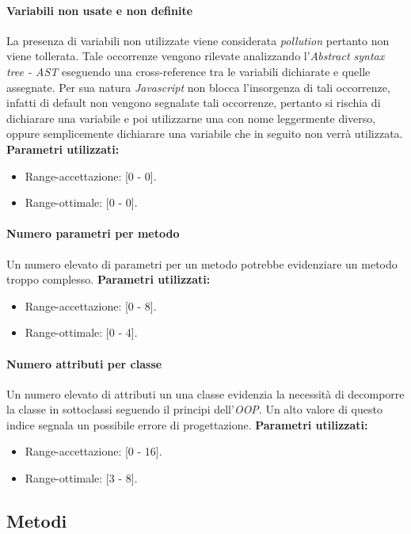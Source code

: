 			\paragraph{Variabili non usate e non definite}
			La presenza di variabili non utilizzate viene considerata \emph{pollution} pertanto non viene tollerata. Tale occorrenze vengono rilevate analizzando l'\emph{Abstract syntax tree - AST} eseguendo una cross-reference tra le variabili dichiarate e quelle assegnate. Per sua natura \emph{Javascript} non blocca l'insorgenza di tali occorrenze, infatti di default non vengono segnalate tali occorrenze, pertanto si rischia  di dichiarare una variabile e poi utilizzarne una con nome leggermente diverso, oppure semplicemente dichiarare una variabile che in seguito non verrà utilizzata.
			\textbf{Parametri utilizzati:}
			\begin{itemize}
				\item Range-accettazione: [0 - 0].
				\item Range-ottimale: [0 - 0].
			\end{itemize}
			
			\paragraph{Numero parametri per metodo}
			Un numero elevato di parametri per un metodo potrebbe evidenziare un metodo troppo complesso.
			\textbf{Parametri utilizzati:}
			\begin{itemize}
				\item Range-accettazione: [0 - 8].
				\item Range-ottimale: [0 - 4].
			\end{itemize}
			
			\paragraph{Numero attributi per classe}
			Un numero elevato di attributi un una classe evidenzia la necessità di decomporre la classe in sottoclassi seguendo il principi dell'\emph{OOP}. Un alto valore di questo indice segnala un possibile errore di progettazione.
			\textbf{Parametri utilizzati:}
			\begin{itemize}
				\item Range-accettazione: [0 - 16].
				\item Range-ottimale: [3 - 8].
			\end{itemize}
			
			
			
			
	\subsection{Metodi}

